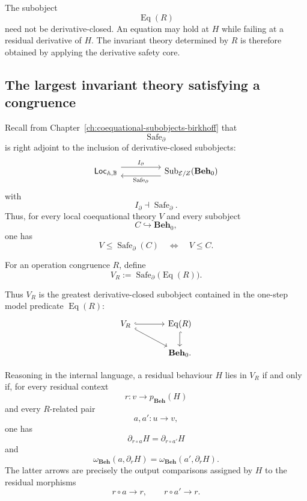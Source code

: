 The subobject
\[
    \operatorname{Eq}(R)
\]
need not be derivative-closed. An equation may hold at \(H\) while failing
at a residual derivative of \(H\). The invariant theory determined by \(R\)
is therefore obtained by applying the derivative safety core.

\subsection{The largest invariant theory satisfying a congruence}
\label{subsec:to-largest-invariant-theory}

Recall from Chapter~\ref{ch:coequational-subobjects-birkhoff} that
\[
    \operatorname{Safe}_{\partial}
\]
is right adjoint to the inclusion of derivative-closed subobjects:
\[
\begin{tikzcd}[column sep=huge]
    \mathsf{Loc}_{\mathbb A,\mathbb B}
        \arrow[r, shift left=1.2ex, "I_\partial"]
    &
    \operatorname{Sub}_{\mathcal E/Z}(\mathbf{Beh}_0)
        \arrow[l, shift left=1.2ex, "\operatorname{Safe}_\partial"]
\end{tikzcd}
\]
with
\[
    I_\partial\dashv\operatorname{Safe}_\partial.
\]
Thus, for every local coequational theory \(V\) and every subobject
\[
    C\hookrightarrow\mathbf{Beh}_0,
\]
one has
\[
    V\leq\operatorname{Safe}_{\partial}(C)
    \quad\Longleftrightarrow\quad
    V\leq C.
\]

\begin{definition}
\label{def:to-theory-of-congruence}
    For an operation congruence \(R\), define
    \[
        V_R
        :=
        \operatorname{Safe}_{\partial}
        \bigl(\operatorname{Eq}(R)\bigr).
    \]
\end{definition}

Thus \(V_R\) is the greatest derivative-closed subobject contained in the
one-step model predicate \(\operatorname{Eq}(R)\):
\[
\begin{tikzcd}[column sep=large]
    V_R
        \arrow[r, hook]
        \arrow[dr, hook]
    &
    \operatorname{Eq}(R)
        \arrow[d, hook]
    \\
    &
    \mathbf{Beh}_0.
\end{tikzcd}
\]

\begin{proposition}
\label{prop:to-contextual-form-VR}
    Reasoning in the internal language, a residual behaviour \(H\) lies in
    \(V_R\) if and only if, for every residual context
    \[
        r:v\to p_{\mathbf{Beh}}(H)
    \]
    and every \(R\)-related pair
    \[
        a,a':u\to v,
    \]
    one has
    \[
        \partial_{r\circ a}H
        =
        \partial_{r\circ a'}H
    \]
    and
    \[
        \omega_{\mathbf{Beh}}(a,\partial_rH)
        =
        \omega_{\mathbf{Beh}}(a',\partial_rH).
    \]
    The latter arrows are precisely the output comparisons assigned by \(H\)
    to the residual morphisms
    \[
        r\circ a\to r,
        \qquad
        r\circ a'\to r.
    \]
\end{proposition}

